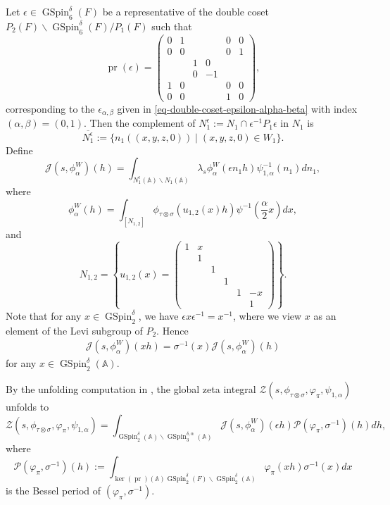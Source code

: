 \documentclass[12pt]{amsart}
\newcommand{\A}{\mathbb{A}}
\theoremstyle{remark}
\newcommand{\pr}{\operatorname{pr}}
\DeclareMathOperator{\GSpin}{GSpin}
\begin{document}
Let $\epsilon\in \GSpin_6^\delta(F)$ be a representative of the double coset $P_2(F)\backslash \GSpin_6^\delta(F)/P_1(F)$ such that
\begin{equation*}
\pr(\epsilon)= \begin{pmatrix}
0&1&&&0&0\\
0&0&&&0&1\\
&&1&0&&\\
&&0&-1&&\\
1&0&&&0&0\\
0&0&&&1&0
\end{pmatrix}  ,
\end{equation*}
corresponding to the $\epsilon_{\alpha,\beta}$ given in \eqref{eq-double-coset-epsilon-alpha-beta} with index $(\alpha,\beta)=(0,1)$. Then the complement of $N_1^\epsilon:=N_1\cap \epsilon^{-1} P_1 \epsilon$ in $N_1$ is 
\begin{equation*}
\overline{N_1^{\epsilon}}:=\{ n_1((x,y,z,0)) \mid (x,y,z,0)\in W_1 \}.	
\end{equation*}
Define
\begin{equation}
\label{eq-JL-eqJ}
\mathcal{J}(s,\phi_\alpha^{W})(h)=\int_{N^{\epsilon}_{1}(\A)\backslash N_{1}(\A)}
\lambda_{s}\phi_\alpha^{W}(\epsilon n_1 h)\psi^{-1}_{1,\alpha}(n_1) d n_1,
\end{equation}
where
$$
\phi_\alpha^{W}(h)=\int_{[N_{1,2}]}\phi_{\tau \otimes \sigma}(u_{1,2}(x)h) \psi^{-1}(\frac{\alpha}{2}x) d x,
$$
and
 \begin{equation*}
 N_{1,2} = \left\{u_{1,2}(x)=
 	\begin{pmatrix}
1 & x & & & &\\
& 1 &&&&\\
&& 1 & &&\\
&&& 1 &&\\
&&&& 1 &-x\\
&&&&&1
\end{pmatrix}\right\}.
 \end{equation*}
Note that for any $x\in \GSpin_2^{\delta}$, we have $\epsilon x \epsilon^{-1} = x^{-1}$, where we view $x$ as an element of the Levi subgroup of $P_2$. Hence 
\begin{align*}
\mathcal{J}(s, \phi_\alpha^{W})(xh)=\sigma^{-1}(x)\mathcal{J}(s, \phi_\alpha^{W})(h)
\end{align*}
for any $x\in \GSpin_2^{\delta}(\A)$.  


By the unfolding computation in \cite[Theorem 3.3]{Yan2025GGP}, the global zeta integral $\mathcal{Z}(s, \phi_{\tau\otimes\sigma}, \varphi_\pi, \psi_{1,\alpha})$ unfolds to
\begin{equation}
\label{eq-JL-eq2}
\mathcal{Z}(s, \phi_{\tau\otimes\sigma}, \varphi_\pi, \psi_{1,\alpha})= \int_{\GSpin^{\delta}_{2}(\A)\backslash \GSpin^{\delta,\alpha}_{3}(\A)}
\mathcal{J}(s, \phi_\alpha^{W})(\epsilon   h)
\mathcal{P}(\varphi_\pi, \sigma^{-1})(h) d h,	
\end{equation}
where
\begin{equation}
\label{eq-JL-eqBesselPeriod}
\mathcal{P}(\varphi_\pi, \sigma^{-1})(h):=\int_{ \ker(\pr)(\A) \GSpin_2^{\delta}(F)\backslash \GSpin_2^{\delta}(\A)  }\varphi_\pi(xh)\sigma^{-1}(x)d x	
\end{equation}
is the Bessel period of $(\varphi_\pi,\sigma^{-1})$. 
\end{document}
